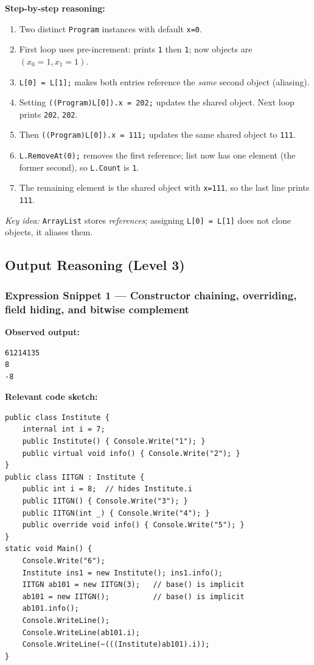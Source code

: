 \textbf{Step-by-step reasoning:}
\begin{enumerate}
  \item Two distinct \verb|Program| instances with default \verb|x=0|.
  \item First loop uses pre-increment: prints \verb|1| then \verb|1|; now objects are \((x_0{=}1, x_1{=}1)\).
  \item \verb|L[0] = L[1];| makes both entries reference the \emph{same} second object (aliasing).
  \item Setting \verb|((Program)L[0]).x = 202;| updates the shared object. Next loop prints \verb|202|, \verb|202|.
  \item Then \verb|((Program)L[0]).x = 111;| updates the same shared object to \verb|111|.
  \item \verb|L.RemoveAt(0);| removes the first reference; list now has one element (the former second), so \verb|L.Count| is \verb|1|.
  \item The remaining element is the shared object with \verb|x=111|, so the last line prints \verb|111|.
\end{enumerate}
\textit{Key idea:} \verb|ArrayList| stores \emph{references}; assigning \verb|L[0] = L[1]| does not clone objects, it aliases them.

\subsection{Output Reasoning (Level 3)}

\subsubsection*{Expression Snippet 1 — Constructor chaining, overriding, field hiding, and bitwise complement}
\textbf{Observed output:}
\begin{verbatim}
61214135
8
-8
\end{verbatim}

\textbf{Relevant code sketch:}
\begin{verbatim}
public class Institute {
    internal int i = 7;
    public Institute() { Console.Write("1"); }
    public virtual void info() { Console.Write("2"); }
}
public class IITGN : Institute {
    public int i = 8;  // hides Institute.i
    public IITGN() { Console.Write("3"); }
    public IITGN(int _) { Console.Write("4"); }
    public override void info() { Console.Write("5"); }
}
static void Main() {
    Console.Write("6");
    Institute ins1 = new Institute(); ins1.info();
    IITGN ab101 = new IITGN(3);   // base() is implicit
    ab101 = new IITGN();          // base() is implicit
    ab101.info();
    Console.WriteLine();
    Console.WriteLine(ab101.i);
    Console.WriteLine(~(((Institute)ab101).i));
}
\end{verbatim}

